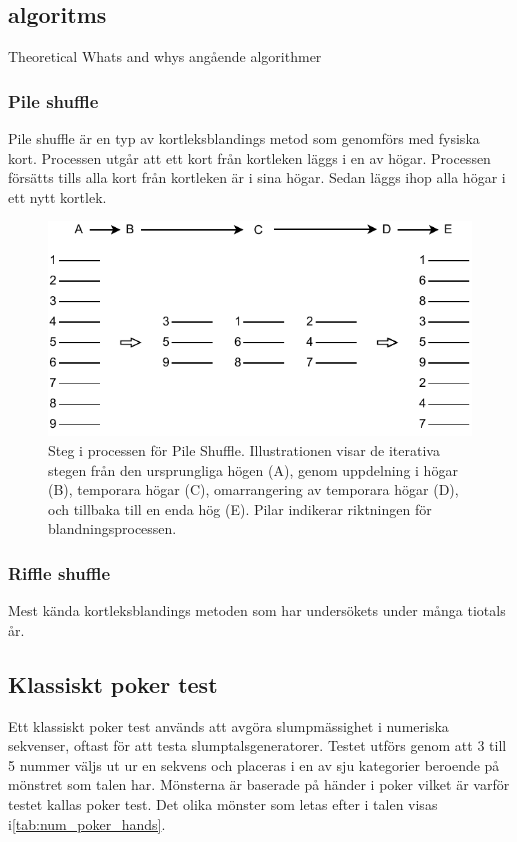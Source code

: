 \documentclass[swedish,a4paper]{article}
\begin{document}
\subsection{algoritms}
Theoretical Whats and whys  angående algorithmer
\subsubsection{Pile shuffle}
\label{sec:pile_shuffle}
Pile shuffle är en typ av kortleksblandings metod som genomförs med fysiska kort. Processen utgår att ett kort
från kortleken läggs i en av högar. Processen försätts tills alla kort från kortleken är i sina högar. Sedan läggs ihop alla högar i ett nytt kortlek. 


\begin{figure}[ht]
	\begin{center}
		\includegraphics{images/pile_shuffle.pdf}
	\end{center}
	\captionsetup{justification=centering,margin=4cm}
	\caption{Steg i processen för Pile Shuffle. Illustrationen visar de
	iterativa stegen från den ursprungliga högen (A), genom uppdelning i
	högar (B), temporara högar (C), omarrangering av temporara högar (D),
	och tillbaka till en enda hög (E). Pilar indikerar riktningen för
	blandningsprocessen.
	}
	\label{fig:pile_shuffle_1}
\end{figure}

\subsubsection{Riffle shuffle}
Mest kända kortleksblandings metoden som har undersökets under många tiotals år.


\subsection{Klassiskt poker test}
\label{sec:poker_test}
Ett klassiskt poker test används att avgöra slump\-mässighet i numeriska 
sekvenser, oftast för att testa slumptalsgeneratorer. Testet utförs genom
att 3 till 5 nummer väljs ut ur en sekvens och placeras i en av sju  kategorier beroende på mönstret som talen har. Mönsterna är baserade på händer i poker vilket är varför testet kallas poker test. 
Det olika mönster som letas efter i talen visas i\cref{tab:num_poker_hands}.
\end{document}

